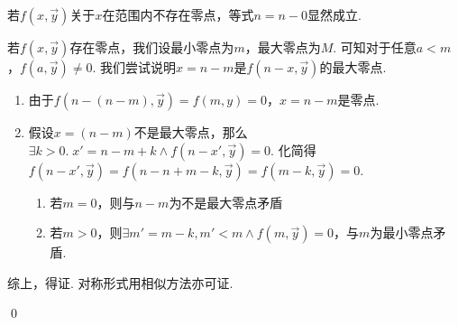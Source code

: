 \begin{pf} \rm 
    若$f(x,\vec{y})$关于$x$在范围内不存在零点，等式$n=n-0$显然成立. 

    若$f(x,\vec{y})$存在零点，我们设最小零点为$m$，最大零点为$M$. 可知对于任意$a<m$，$f(a,\vec{y})\not=0$. 我们尝试说明$x=n-m$是$f(n-x,\vec{y})$的最大零点.

    \begin{enumerate}
        \item 由于$f(n-(n-m),\vec{y})=f(m,y)=0$，$x=n-m$是零点.
        \item 假设$x=(n-m)$不是最大零点，那么$\exists k>0.\;x'=n-m+k\wedge f(n-x',\vec{y})=0$. 化简得$f(n-x',\vec{y})=f(n-n+m-k,\vec{y})=f(m-k,\vec{y})=0$. 
        \begin{enumerate}
            \item 若$m=0$，则与$n-m$为不是最大零点矛盾
            \item 若$m>0$，则$\exists m'=m-k, m'< m \wedge f(m,\vec{y})=0$，与$m$为最小零点矛盾. 
        \end{enumerate}
    \end{enumerate}

    综上，得证. 对称形式用相似方法亦可证.

    \qed
\end{pf}
